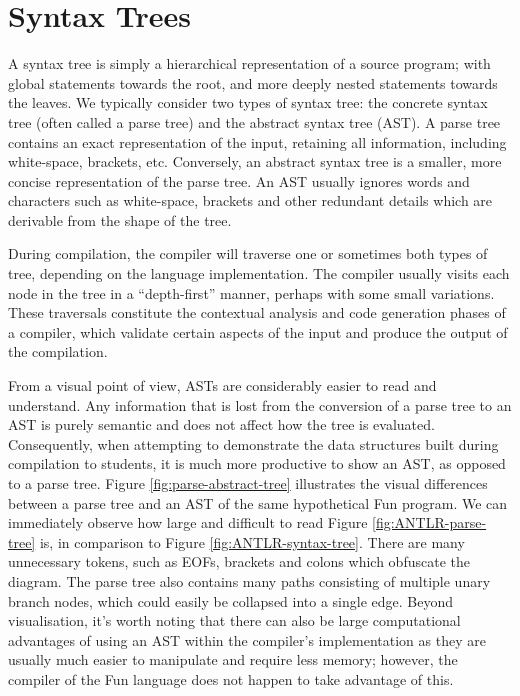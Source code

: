 \documentclass{l4proj}
\begin{document}
\section{Syntax Trees}
A syntax tree is simply a hierarchical representation of a source program; with global statements towards the root, and more deeply nested statements towards the leaves. We typically consider two types of syntax tree: the concrete syntax tree (often called a parse tree) and the abstract syntax tree (AST). A parse tree contains an exact representation of the input, retaining all information, including white-space, brackets, etc. Conversely, an abstract syntax tree is a smaller, more concise representation of the parse tree. An AST usually ignores words and characters such as white-space, brackets and other redundant details which are derivable from the shape of the tree. 

During compilation, the compiler will traverse one or sometimes both types of tree, depending on the language implementation. The compiler usually visits each node in the tree in a ``depth-first'' manner, perhaps with some small variations. These traversals constitute the contextual analysis and code generation phases of a compiler, which validate certain aspects of the input and produce the output of the compilation. 

From a visual point of view, ASTs are considerably easier to read and understand. Any information that is lost from the conversion of a parse tree to an AST is purely semantic and does not affect how the tree is evaluated. Consequently, when attempting to demonstrate the data structures built during compilation to students, it is much more productive to show an AST, as opposed to a parse tree. Figure \ref{fig:parse-abstract-tree} illustrates the visual differences between a parse tree and an AST of the same hypothetical Fun program. We can immediately observe how large and difficult to read Figure \ref{fig:ANTLR-parse-tree} is, in comparison to Figure \ref{fig:ANTLR-syntax-tree}. There are many unnecessary tokens, such as EOFs, brackets and colons which obfuscate the diagram. The parse tree also contains many paths consisting of multiple unary branch nodes, which could easily be collapsed into a single edge. Beyond visualisation, it's worth noting that there can  also be large computational advantages of using an AST within the compiler's implementation as they are usually much easier to manipulate and require less memory; however, the compiler of the Fun language does not happen to take advantage of this. 
\end{document}

